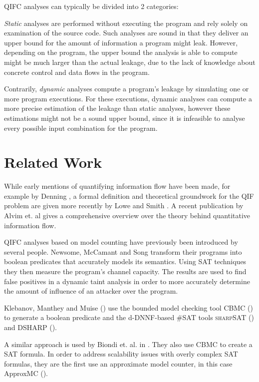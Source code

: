 QIFC analyses can typically be divided into 2 categories:

\emph{Static} analyses are performed without executing the program and rely solely on examination of the source code. Such analyses are sound in that they deliver an upper bound for the amount of information a program might leak. However, depending on the program, the upper bound the analysis is able to compute might be much larger than the actual leakage, due to the lack of knowledge about concrete control and data flows in the program.

Contrarily, \emph{dynamic} analyses compute a program's leakage by simulating one or more program executions. For these executions, dynamic analyses can compute a more precise estimation of the leakage than static analyses, however these estimations might not be a sound upper bound, since it is infeasible to analyse every possible input combination for the program.

\section{Related Work}\label{sec:relWork}

While early mentions of quantifying information flow have been made, for example by Denning \cite{denning82}, a formal definition and theoretical groundwork for the QIF problem are given more recently by Lowe \cite{lowe02} and Smith \cite{smith09}. A recent publication by Alvim et. al \cite{alvim19} gives a comprehensive overview over the theory behind quantitative information flow.

QIFC analyses based on model counting have previously been introduced by several people.
Newsome, McCamant and Song \cite{newsome09} transform their programs into boolean predicates that accurately models its semantics. Using SAT techniques they then measure the program's channel capacity. The results are used to find false positives in a dynamic taint analysis in order to more accurately determine the amount of influence of an attacker over the program.

Klebanov, Manthey and Muise (\cite{klebanov13}) use the bounded model checking tool CBMC (\cite{cbmc}) to generate a boolean predicate and the d-DNNF-based \#SAT tools \textsc{sharp}SAT (\cite{thurley06}) and \textsc{DSHARP} (\cite{muise12}).

A similar approach is used by Biondi et. al. in \cite{biondi18}. They also use CBMC to create a SAT formula. In order to address scalability issues with overly complex SAT formulas, they are the first use an approximate model counter, in this case ApproxMC (\cite{chakraborty13}).

